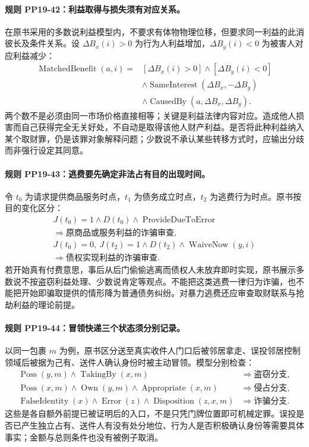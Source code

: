 \paragraph{规则 PP19-42：利益取得与损失须有对应关系。}
\mbox{}\par
在原书采用的多数说利益模型内，不要求有体物物理位移，但要求同一利益的此消彼长及条件关系。设 $\Delta B_x(i)>0$ 为行为人利益增加，$\Delta B_y(i)<0$ 为被害人对应利益减少：
\[
\begin{aligned}
\operatorname{MatchedBenefit}(a,i)={}&[\Delta B_x(i)>0]
\land[\Delta B_y(i)<0]\\
&\land\operatorname{SameInterest}(\Delta B_x,-\Delta B_y)
\\
&\land\operatorname{CausedBy}(a,\Delta B_x,\Delta B_y).
\end{aligned}
\]
两个数不是必须由同一市场价格直接相等；关键是利益法律内容对应。造成他人损害而自己获得完全无关好处，不自动是取得该他人财产利益。是否将此种利益纳入某个取财罪，仍是该罪对象解释问题；少数说不承认某些转移方式时，应输出分歧而非强行设定其同意。

\paragraph{规则 PP19-43：逃费要先确定非法占有目的出现时间。}
\mbox{}\par
令 $t_0$ 为请求提供商品服务时点，$t_1$ 为债务成立时点，$t_2$ 为逃费行为时点。原书按目的变化区分：
\[
\begin{gathered}
J(t_0)=1\land D(t_0)\land\operatorname{ProvideDueToError}\\
\Rightarrow\text{原商品或服务利益的诈骗审查},\\
J(t_0)=0,\ J(t_2)=1\land D(t_2)\land\operatorname{WaiveNow}(y,i)\\
\Rightarrow\text{债权实现利益的诈骗审查}.
\end{gathered}
\]
若开始真有付费意思，事后从后门偷偷逃离而债权人未放弃即时实现，原书展示多数说不按盗窃利益处理、少数说肯定等观点。不能把这类逃费一律归为诈骗，也不能把开始即骗取提供的情形降为普通债务纠纷。对暴力逃费还应审查取财联系与抢劫利益的理论前提。

\paragraph{规则 PP19-44：冒领快递三个状态须分别记录。}
\mbox{}\par
以同一包裹 $m$ 为例，原书区分送至真实收件人门口后被邻居拿走、误投邻居控制领域后被据为己有、送件人确认身份时被主动冒领。模型分别检查：
\[
\begin{aligned}
\operatorname{Poss}(y,m)\land\operatorname{TakingBy}(x,m)&\Rightarrow\text{盗窃分支},\\
\operatorname{Poss}(x,m)\land\operatorname{Own}(y,m)
\land\operatorname{Appropriate}(x,m)&\Rightarrow\text{侵占分支},\\
\operatorname{FalseIdentity}(x)\land\operatorname{Error}(z)
\land\operatorname{Disposition}(z,x,m)&\Rightarrow\text{诈骗分支}.
\end{aligned}
\]
这些是各自额外前提已被证明后的入口，不是只凭门牌位置即可机械定罪。误投是否已产生独立占有、送件人有没有处分地位、行为人是否积极确认身份等需要具体事实；金额与总则条件也没有被例子取消。

